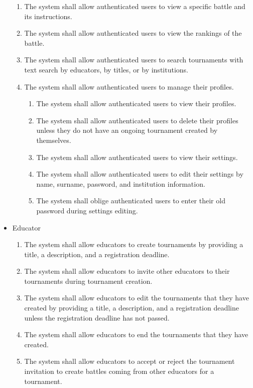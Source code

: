\begin{itemize}
\begin{enumerate}
  \item The system shall allow authenticated users to view a specific battle and its instructions.
  \item The system shall allow authenticated users to view the rankings of the battle.
  \item The system shall allow authenticated users to search tournaments with text search by educators, by titles, or by institutions.
  \item The system shall allow authenticated users to manage their profiles.
  \begin{enumerate}
      \item The system shall allow authenticated users to view their profiles.
      
  \item The system shall allow authenticated users to delete their profiles unless they do not have an ongoing tournament created by themselves.

    \item The system shall allow authenticated users to view their settings.
  \item The system shall allow authenticated users to edit their settings by name, surname, password, and institution information.
  \item The system shall oblige authenticated users to enter their old password during settings editing.
  
      
  \end{enumerate}




	\end{enumerate}
	\item Educator
        \begin{enumerate}[resume]
            \item The system shall allow educators to create tournaments by providing a title, a description, and a registration deadline.
            \item The system shall allow educators to invite other educators to their tournaments during tournament creation.
            \item The system shall allow educators to edit the tournaments that they have created by providing a title, a description, and a registration deadline unless the registration deadline has not passed.
            \item The system shall allow educators to end the tournaments that they have created.
            \item The system shall allow educators to accept or reject the tournament invitation to create battles coming from other educators for a tournament.


\end{enumerate}
\end{itemize}

